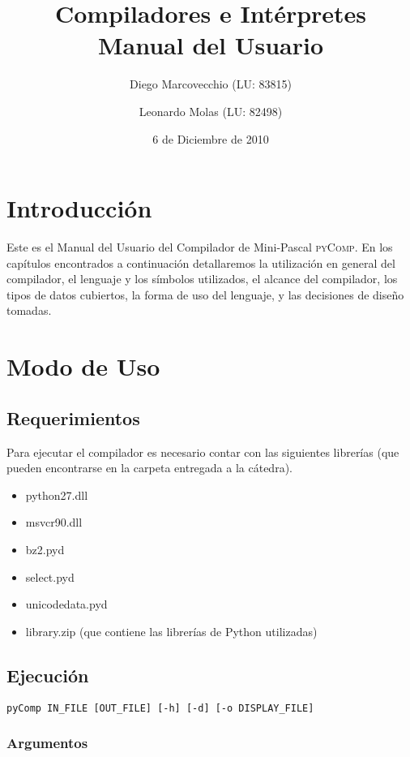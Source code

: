 \documentclass[a4paper,oneside]{report}
\title{Compiladores e Intérpretes\\Manual del Usuario}
\author{Diego Marcovecchio (LU: 83815)\and Leonardo Molas (LU: 82498)}
\date{6 de Diciembre de 2010}
\begin{document}
	
\maketitle
		
\tableofcontents


\chapter*{Introducción} 


Este es el Manual del Usuario del Compilador de Mini-Pascal \textsc{pyComp}. En los capítulos encontrados a continuación detallaremos la utilización en general del compilador, el lenguaje y los símbolos utilizados, el alcance del compilador, los tipos de datos cubiertos, la forma de uso del lenguaje, y las decisiones de diseño tomadas.

\chapter{Modo de Uso}

\section{Requerimientos}
Para ejecutar el compilador es necesario contar con las siguientes librerías (que pueden encontrarse en la carpeta entregada a la cátedra).

\begin{itemize}\ttfamily
	\item python27.dll
	\item msvcr90.dll
	\item bz2.pyd
	\item select.pyd
	\item unicodedata.pyd
	\item library.zip \rmfamily (que contiene las librerías de Python utilizadas)
\end{itemize}

\section{Ejecución}

\verb|pyComp IN_FILE [OUT_FILE] [-h] [-d] [-o DISPLAY_FILE]|

\subsection*{Argumentos}
\end{document}
